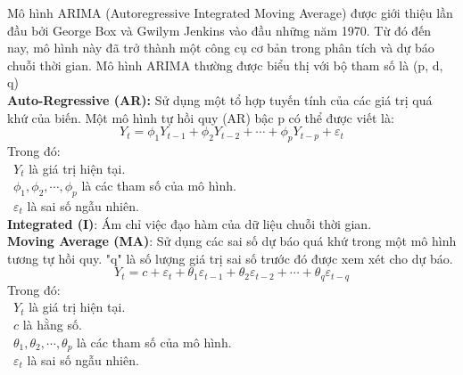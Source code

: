 Mô hình ARIMA (Autoregressive Integrated Moving Average) được giới thiệu lần đầu bởi George Box và Gwilym Jenkins vào đầu những năm 1970. Từ đó đến nay, mô hình này đã trở thành một công cụ cơ bản trong phân tích và dự báo chuỗi thời gian. Mô hình ARIMA thường được biểu thị với bộ tham số là (p, d, q)\\
\textbf{Auto-Regressive (AR):} Sử dụng một tổ hợp tuyến tính của các giá trị quá khứ của biến. Một mô hình tự hồi quy (AR) bậc p có thể được viết là:
\[
Y_{t}=\phi_{1}Y_{t-1}+\phi_{2}Y_{t-2}+\cdots+\phi_{p}Y_{t-p}+\varepsilon_{t}
\]
Trong đó:\\
    \indent\textbullet\ \(Y_{t}\) là giá trị hiện tại.\\
    \indent\textbullet\ \(\phi_{1},\phi_{2},\cdots,\phi_{p}\) là các tham số của mô hình.\\
    \indent\textbullet\ \(\varepsilon_{t}\) là sai số ngẫu nhiên.\\
\textbf{Integrated (I)}: Ám chỉ việc đạo hàm của dữ liệu chuỗi thời gian.\\
\textbf{Moving Average (MA)}: Sử dụng các sai số dự báo quá khứ trong một mô hình tương tự hồi quy. "q" là số lượng giá trị sai số trước đó được xem xét cho dự báo.
\[
Y_{t}=c+\varepsilon_{t}+\theta_{1}\varepsilon_{t-1}+\theta_{2}\varepsilon_{t-2}+ \cdots+ \theta_{q}\varepsilon_{t-q}
\]
Trong đó:\\
    \indent\textbullet\ \(Y_{t}\) là giá trị hiện tại.\\
    \indent\textbullet\ \(c\) là hằng số.\\
    \indent\textbullet\ \(\theta_{1},\theta_{2},\cdots,\theta_{p}\) là các tham số của mô hình.\\
    \indent\textbullet\ \(\varepsilon_{t}\) là sai số ngẫu nhiên.